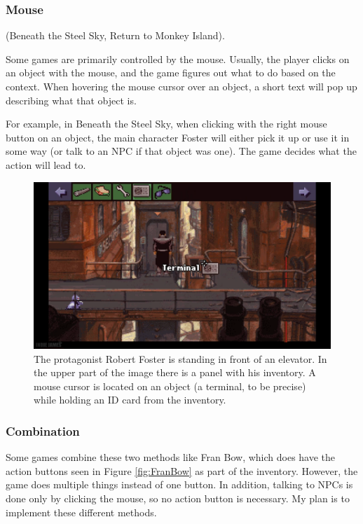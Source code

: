 \subsubsection{Mouse}
 (Beneath the Steel Sky, Return to Monkey Island). 

Some games are primarily controlled by the mouse. Usually, the player clicks on an object with the mouse, and the game figures out what to do based on the context. When hovering the mouse cursor over an object, a short text will pop up describing what that object is.

For example, in Beneath the Steel Sky, when clicking with the right mouse button on an object, the main character Foster will either pick it up or use it in some way (or talk to an NPC if that object was one). The game decides what the action will lead to.

\begin{figure}[H]
\centering
\includegraphics[width=1.\linewidth]{img/BaSS.png}
\caption{The protagonist Robert Foster is standing in front of an elevator. In the upper part of the image there is a panel with his inventory. A mouse cursor is located on an object (a terminal, to be precise) while holding an ID card from the inventory.}
\label{fig:BaSS}
\end{figure}

\subsubsection{Combination}
Some games combine these two methods like Fran Bow, which does have the action buttons seen in Figure \ref{fig:FranBow} as part of the inventory. However, the game does multiple things instead of one button. In addition, talking to NPCs is done only by clicking the mouse, so no action button is necessary. My plan is to implement these different methods.


